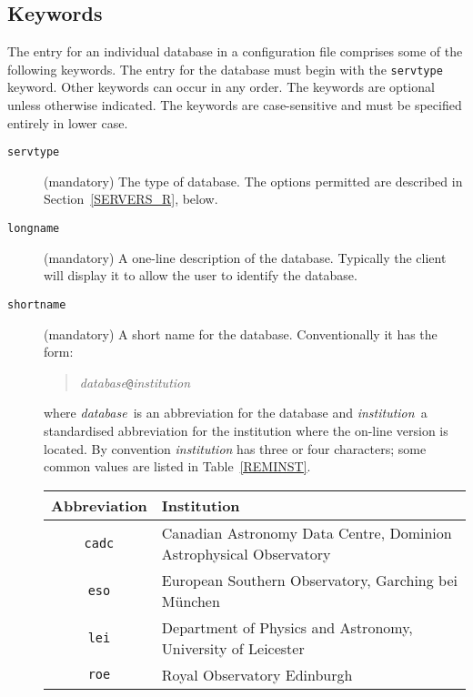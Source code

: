 \documentclass[twoside,11pt]{article}
\renewcommand{\_}{\texttt{\symbol{95}}}
\begin{document}
\subsection{\label{KEYWORDS_R}Keywords}

The entry for an individual database in a configuration file comprises
some of the following keywords.  The entry for the database must begin
with the {\tt serv\_type} keyword.  Other keywords can occur in any
order.  The keywords are optional unless otherwise indicated.  The
keywords are case-sensitive and must be specified entirely in lower case.

\begin{description}

  \item[{\tt serv\_type}] (mandatory) The type of database.  The
   options permitted are described in Section~\ref{SERVERS_R}, below.

  \item[{\tt long\_name}] (mandatory) A one-line description of the
   database.  Typically the client will display it to allow the user to
   identify the database.

  \item[{\tt short\_name}] (mandatory) A short name for the database.
   Conventionally it has the form:

  \begin{quote}
   {\it database}{\tt @}{\it institution}
  \end{quote}

   where {\it database}\, is an abbreviation for the database and {\it
   institution}\, a standardised abbreviation for the institution where the
   on-line version is located.  By convention {\it institution}\/ has three
   or four characters; some common values are listed in Table~\ref{REMINST}.

\begin{table}[htbp]

\begin{center}
\begin{tabular}{cl}
Abbreviation  &  Institution  \\ \hline
{\tt cadc} & Canadian Astronomy Data Centre, Dominion Astrophysical
    Observatory  \\
{\tt eso} &  European Southern Observatory, Garching bei M\"{u}nchen \\
{\tt lei} &  Department of Physics and Astronomy, University of Leicester \\
{\tt roe} &  Royal Observatory Edinburgh \\
\end{tabular}
\end{center}


\end{table}
\end{description}
\end{document}
